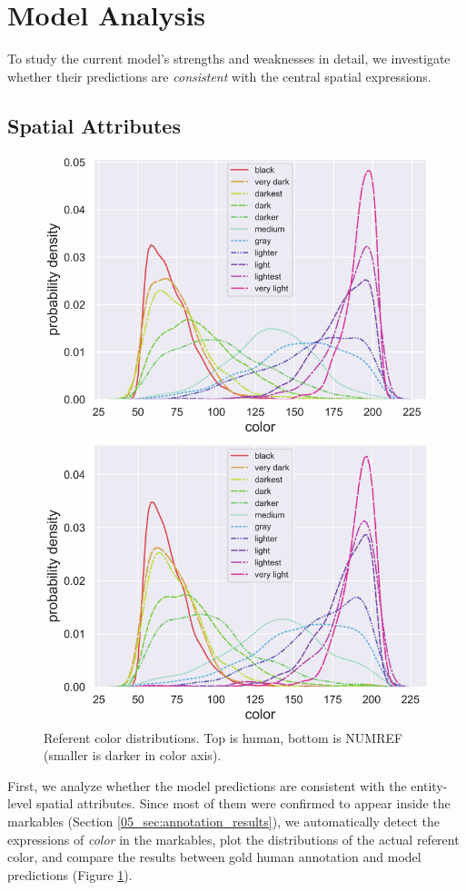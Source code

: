 \section{Model Analysis}
\label{05_sec:model_analysis}

To study the current model's strengths and weaknesses in detail, we investigate whether their predictions are \textit{consistent} with the central spatial expressions.

\subsection{Spatial Attributes}
\label{05_subsec:spatial_attributes}

\begin{figure}[ht]
\centering
\includegraphics[width=0.6\columnwidth]{referent_color.pdf}
\caption{Referent color distributions. Top is human, bottom is NUMREF (smaller is darker in color axis).}
\label{05_fig:referent_color}
\end{figure}

First, we analyze whether the model predictions are consistent with the entity-level spatial attributes. Since most of them were confirmed to appear inside the markables (Section \ref{05_sec:annotation_results}), we automatically detect the expressions of \textit{color} in the markables, plot the distributions of the actual referent color, and compare the results between gold human annotation and model predictions (Figure \ref{05_fig:referent_color}).

